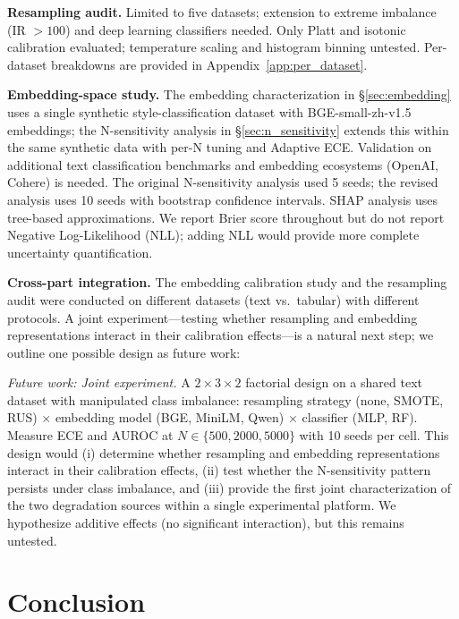 \documentclass[11pt]{article}
\begin{document}
\textbf{Resampling audit.} Limited to five datasets; extension to extreme imbalance (IR $> 100$) and deep learning classifiers needed. Only Platt and isotonic calibration evaluated; temperature scaling and histogram binning untested. Per-dataset breakdowns are provided in Appendix~\ref{app:per_dataset}.

\textbf{Embedding-space study.} The embedding characterization in §\ref{sec:embedding} uses a single synthetic style-classification dataset with BGE-small-zh-v1.5 embeddings; the N-sensitivity analysis in §\ref{sec:n_sensitivity} extends this within the same synthetic data with per-N tuning and Adaptive ECE. Validation on additional text classification benchmarks and embedding ecosystems (OpenAI, Cohere) is needed. The original N-sensitivity analysis used 5 seeds; the revised analysis uses 10 seeds with bootstrap confidence intervals. SHAP analysis uses tree-based approximations. We report Brier score throughout but do not report Negative Log-Likelihood (NLL); adding NLL would provide more complete uncertainty quantification.

\textbf{Cross-part integration.} The embedding calibration study and the resampling audit were conducted on different datasets (text vs.\ tabular) with different protocols. A joint experiment---testing whether resampling and embedding representations interact in their calibration effects---is a natural next step; we outline one possible design as future work:

\textit{Future work: Joint experiment.} A $2 \times 3 \times 2$ factorial design on a shared text dataset with manipulated class imbalance: resampling strategy (none, SMOTE, RUS) $\times$ embedding model (BGE, MiniLM, Qwen) $\times$ classifier (MLP, RF). Measure ECE and AUROC at $N \in \{500, 2000, 5000\}$ with 10 seeds per cell. This design would (i) determine whether resampling and embedding representations interact in their calibration effects, (ii) test whether the N-sensitivity pattern persists under class imbalance, and (iii) provide the first joint characterization of the two degradation sources within a single experimental platform. We hypothesize additive effects (no significant interaction), but this remains untested.

\section{Conclusion}
\end{document}

